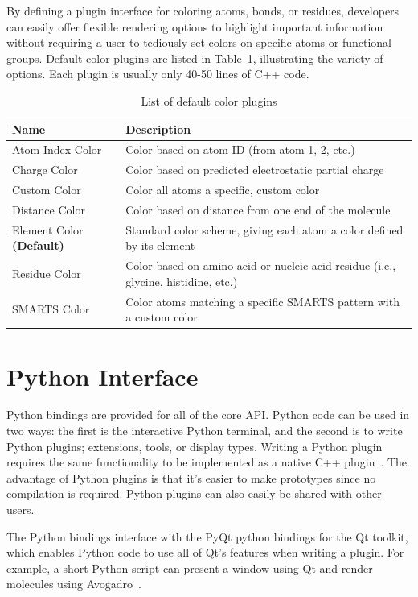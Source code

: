 \documentclass[10pt]{bmc_article}
\newenvironment{bmcformat}{\begin{raggedright}
\baselineskip20pt\sloppy\setboolean{publ}{false}}{\end{raggedright}
\baselineskip20pt\sloppy}
\begin{document}
\begin{bmcformat}
By defining a plugin interface for coloring atoms, bonds, or residues,
developers can easily offer flexible rendering options to highlight
important information without requiring a user to tediously set colors
on specific atoms or functional groups. Default color plugins are
listed in Table~\ref{color-table}, illustrating the variety of
options. Each plugin is usually only 40-50 lines of C++ code.

\begin{table}
  \caption{List of default color plugins}
  \label{color-table}
\begin{tabular}{l | l}
\hline
Name & Description \\
\hline
Atom Index Color & Color based on atom ID (from atom 1, 2, etc.) \\
Charge Color & Color based on predicted electrostatic partial charge \\
Custom Color & Color all atoms a specific, custom color \\
Distance Color & Color based on distance from one end of the
molecule \\
Element Color \textbf{(Default)} & Standard color scheme, giving each
atom a color defined by its element\\
Residue Color & Color based on amino acid or nucleic acid residue (i.e., glycine,
histidine, etc.) \\
SMARTS Color & Color atoms matching a specific SMARTS pattern with a
custom color \\
\hline
\end{tabular}
\end{table}

\section{Python Interface} %

Python bindings are provided for all of the core API. Python code can be used
in two ways: the first is the interactive Python terminal, and the second is to
write Python plugins; extensions, tools, or display types.
Writing a Python plugin requires the same functionality to be implemented as a
native C++ plugin~\cite{PythonExtensions}. The advantage of Python
plugins is that it's easier to make prototypes since no compilation is
required. Python plugins can also easily be shared with other users.

The Python bindings interface with the PyQt python bindings for the Qt
toolkit, which enables Python code to use all of Qt's features when writing a
plugin. For example, a short Python script can present a window using Qt and
render molecules using Avogadro~\cite{PythonWindowExample}.


\end{bmcformat}
\end{document}
